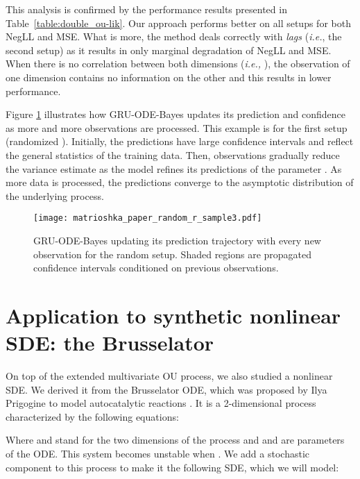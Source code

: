\documentclass{article}
\newcommand{\method}{GRU-ODE-Bayes}
\begin{document}
This analysis is confirmed by the performance results presented in Table~\ref{table:double_ou-lik}. Our approach performs better on all setups for both NegLL and MSE. What is more, the method deals correctly with \emph{lags} (\emph{i.e.}, the second setup) as it results in only marginal degradation of NegLL and MSE. When there is no correlation between both dimensions (\emph{i.e.,} ), the observation of one dimension contains no information on the other and this results in lower performance.



Figure \ref{fig:matriochka} illustrates how \method{} updates its prediction and confidence as more and more observations are processed. This example is for the first setup (randomized ).
Initially, the predictions have large confidence intervals and reflect the general statistics of the training data.
Then, observations gradually reduce the variance estimate as the model refines its predictions of the parameter . 
As more data is processed, the predictions converge to the asymptotic distribution of the underlying process. 


\begin{figure}[bht]
\vskip 0.0in
\begin{center}
\centerline{\texttt{[image: matrioshka\_paper\_random\_r\_sample3.pdf]}}
\caption{GRU-ODE-Bayes updating its prediction trajectory with every new observation for the random  setup. Shaded regions are propagated confidence intervals conditioned on previous observations. }
\label{fig:matriochka}
\end{center}
\vskip -0.2in
\end{figure}

\section{Application to synthetic nonlinear SDE: the Brusselator}
\label{app:BXLator}

On top of the extended multivariate OU process, we also studied a nonlinear SDE. We derived it from the Brusselator ODE, which was proposed by Ilya Prigogine to model autocatalytic reactions \citep{prigogine1982being}. It is a 2-dimensional process characterized by the following equations:



Where  and  stand for the two dimensions of the process and  and  are parameters of the ODE. This system becomes unstable when . We add a stochastic component to this process to make it the following SDE, which we will model:
\end{document}
